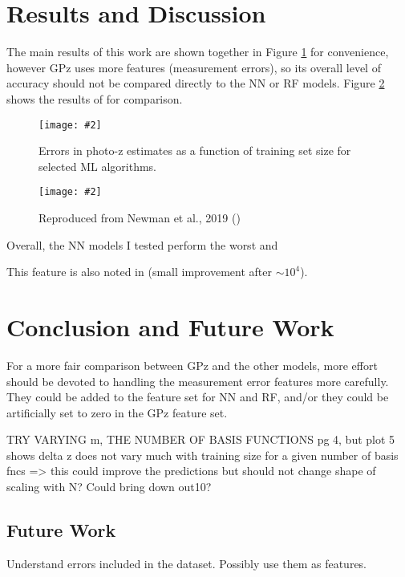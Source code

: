 \documentclass[13pt]{amsart}
\newcommand{\figscale}[4]{
\begin{figure}[h]
    \centering
    \caption{#3}
    \label{#4}
    \texttt{[image: \#2]}
\end{figure}
}
\begin{document}
\section{Results and Discussion}

  The main results of this work are shown together in Figure \ref{fig:errs} for convenience, however GPz uses more features (measurement errors), so its overall level of accuracy should not be compared directly to the NN or RF models. Figure \ref{fig:newman} shows the results of \cite{newman} for comparison.

  \figscale{1}{../data/errors_plots/errors.png}{Errors in photo-z estimates as a function of training set size for selected ML algorithms.}{fig:errs}

  \figscale{1}{../proposal/photozerrors.png}{Reproduced from Newman et al., 2019 (\cite{newman})}{fig:newman}

  Overall, the NN models I tested perform the worst and

  This feature is also noted in \cite{gpz} (small improvement after $\sim 10^4$).


\section{Conclusion and Future Work}

  For a more fair comparison between GPz and the other models, more effort should be devoted to handling the measurement error features more carefully. They could be added to the feature set for NN and RF, and/or they could be artificially set to zero in the GPz feature set.


        TRY VARYING m, THE NUMBER OF BASIS FUNCTIONS \cite{sgp} pg 4, but plot 5 shows delta z does not vary much with training size for a given number of basis fncs => this could improve the predictions but should not change shape of scaling with N? Could bring down out10?



  \subsection{Future Work}

    Understand errors included in the dataset. Possibly use them as features.
\end{document}
